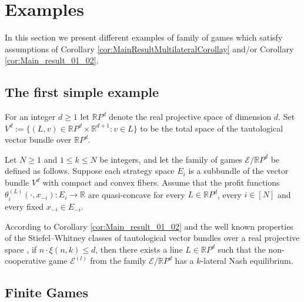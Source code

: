 \documentclass[a4paper,11pt,reqno,english]{amsart}
\theoremstyle{plain}
\theoremstyle{definition}
\newcommand\R{\mathbb{R}}
\newcommand{\Ecal}{\mathcal{E}}
\begin{document}
\section{Examples}

In this section we present different examples of family of games which satisfy assumptions of Corollary \ref{cor:MainResultMultilateralCorollay} and/or  Corollary \ref{cor:Main_result_01_02}.

\subsection{The first simple example}
For an integer $d\geq 1$ let $\R P^d$ denote the real projective space of dimension $d$.
Set $V^d:=\{(L,v)\in \R P^d\times\R^{d+1} : v\in L\}$ to be the total space of the tautological vector bundle over $\R P^d$.
 

\medskip
Let $N\geq 1$ and $1\leq k\leq N$ be integers, and let the family of games $\Ecal/\R P^d$ be defined as follows.
Suppose each strategy space $E_i$ is a subbundle of the vector bundle $V^{d}$ with compact and convex fibers.
Assume that the profit functions $\theta_i^{(L)}(\cdot, x_{-i})\colon E_i\longrightarrow\mathbb{R}$ are quasi-concave for every $L\in \R P^d$, every $i\in [N]$ and every fixed $x_{-i}\in E_{-i}$.

\medskip
According to Corollary \ref{cor:Main_result_01_02} and the well known properties of the Stiefel--Whitney classes of tautological vector bundles over a real projective space \cite[Ch.\,4]{Milnor1974}, if $n\cdot \xi(n,k)\leq d$, then there exists a line  $L\in \R P^d$ such that the non-cooperative game $\Ecal^{(l)}$ from the family $\Ecal/\R P^d$ has a $k$-lateral Nash equilibrium.


\subsection{Finite Games}
\end{document}
